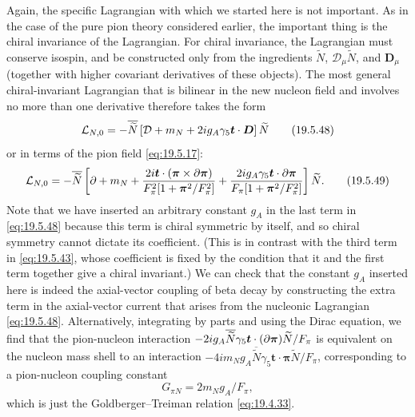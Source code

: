 Again, the specific Lagrangian with which we started here is not important. As in the case of the pure pion theory considered earlier, the important thing is the chiral invariance of the Lagrangian. For chiral invariance, the Lagrangian must conserve isospin, and be constructed only from the ingredients $\widetilde N$, $\mathcal D_\mu\widetilde N$, and $\boldsymbol D_\mu$ (together with higher covariant derivatives of these objects). The most general chiral-invariant Lagrangian that is bilinear in the new nucleon field and involves no more than one derivative therefore takes the form
\begin{equation}
\mathcal L_{N,0}
=-\overline{\widetilde N}
\left[
\sl{\mathcal D}+m_N
+2ig_A\gamma_5\boldsymbol t\cdot\sl{\boldsymbol D}
\right]\widetilde N
\tag{19.5.48}\label{eq:19.5.48}
\end{equation}
or in terms of the pion field \eqref{eq:19.5.17}:
\begin{equation}
\mathcal L_{N,0}
=-\overline{\widetilde N}
\left[
\sl{\partial}+m_N
+\frac{2i\boldsymbol t\cdot
(\boldsymbol{\pi}\times\sl{\partial}\boldsymbol{\pi})}
{F_\pi^2[1+\boldsymbol{\pi}^2/F_\pi^2]}
+\frac{2ig_A\gamma_5\boldsymbol t\cdot
\sl{\partial}\boldsymbol{\pi}}
{F_\pi[1+\boldsymbol{\pi}^2/F_\pi^2]}
\right]\widetilde N.
\tag{19.5.49}\label{eq:19.5.49}
\end{equation}
Note that we have inserted an arbitrary constant $g_A$ in the last term in \eqref{eq:19.5.48} because this term is chiral symmetric by itself, and so chiral symmetry cannot dictate its coefficient. (This is in contrast with the third term in \eqref{eq:19.5.43}, whose coefficient is fixed by the condition that it and the first term together give a chiral invariant.) We can check that the constant $g_A$ inserted here is indeed the axial-vector coupling of beta decay by constructing the extra term in the axial-vector current that arises from the nucleonic Lagrangian \eqref{eq:19.5.48}. Alternatively, integrating by parts and using the Dirac equation, we find that the pion-nucleon interaction $-2ig_A\overline{\widetilde N}\gamma_5\boldsymbol t\cdot(\sl{\partial}\boldsymbol{\pi})\widetilde N/F_\pi$ is equivalent on the nucleon mass shell to an interaction $-4im_Ng_A\overline{\widetilde N}\gamma_5\boldsymbol t\cdot\boldsymbol{\pi}\widetilde N/F_\pi$, corresponding to a pion-nucleon coupling constant
\[
G_{\pi N}=2m_Ng_A/F_\pi,
\]
which is just the Goldberger--Treiman relation \eqref{eq:19.4.33}.

